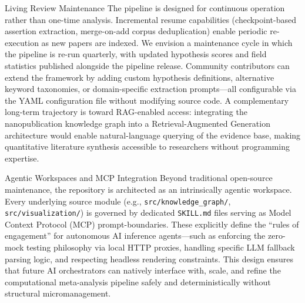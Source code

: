 \documentclass[
  ignorenonframetext,
]{beamer}
\begin{document}
\begin{frame}[fragile]{Living Review Maintenance}
\protect{}\label{living-review-maintenance}
The pipeline is designed for continuous operation rather than one-time
analysis. Incremental resume capabilities (checkpoint-based assertion
extraction, merge-on-add corpus deduplication) enable periodic
re-execution as new papers are indexed. We envision a maintenance cycle
in which the pipeline is re-run quarterly, with updated hypothesis
scores and field statistics published alongside the pipeline release.
Community contributors can extend the framework by adding custom
hypothesis definitions, alternative keyword taxonomies, or
domain-specific extraction prompts---all configurable via the YAML
configuration file without modifying source code. A complementary
long-term trajectory is toward RAG-enabled access: integrating the
nanopublication knowledge graph into a Retrieval-Augmented Generation
architecture \citep{fan2024survey} would enable natural-language
querying of the evidence base, making quantitative literature synthesis
accessible to researchers without programming expertise.

\begin{block}{Agentic Workspaces and MCP Integration}
\protect{}\label{agentic-workspaces-and-mcp-integration}
Beyond traditional open-source maintenance, the repository is
architected as an intrinsically agentic workspace. Every underlying
source module (e.g., \texttt{src/knowledge\_graph/},
\texttt{src/visualization/}) is governed by dedicated \texttt{SKILL.md}
files serving as Model Context Protocol (MCP) prompt-boundaries. These
explicitly define the ``rules of engagement'' for autonomous AI
inference agents---such as enforcing the zero-mock testing philosophy
via local HTTP proxies, handling specific LLM fallback parsing logic,
and respecting headless rendering constraints. This design ensures that
future AI orchestrators can natively interface with, scale, and refine
the computational meta-analysis pipeline safely and deterministically
without structural micromanagement.
\end{block}
\end{frame}
\end{document}
